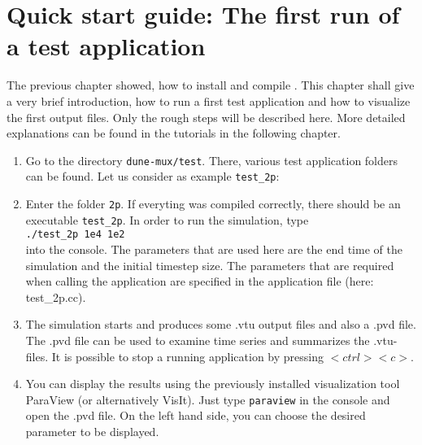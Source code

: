 \section[Quick start guide]{Quick start guide: The first run of a test application}\label{quick-start-guide}

The previous chapter showed, how to install and compile \Dumux. This chapter shall give a very brief introduction, how to run a first test application and how to visualize the first output files. Only the rough steps will be described here. More detailed explanations can be found in the tutorials in the following chapter.

\begin{enumerate}
 \item Go to the directory \texttt{dune-mux/test}. There, various test application folders can be found. Let us consider as example \texttt{test{\_}2p}:
 \item Enter the folder \texttt{2p}. If everyting was compiled correctly, there should be an executable \texttt{test{\_}2p}. In order to run the simulation, type\\ 
\texttt{./test{\_}2p 1e4 1e2}\\
into the console. The parameters that are used here are the end time of the simulation and the initial timestep size. The parameters that are required when calling the application are specified in the application file (here: test{\_}2p.cc).
 \item The simulation starts and produces some .vtu output files and also a .pvd file. The .pvd file can be used to examine time series and summarizes the .vtu-files. It is possible to stop a running application by pressing $<ctrl><c>$.
 \item You can display the results using the previously installed visualization tool ParaView (or alternatively VisIt). Just type \texttt{paraview} in the console and open the .pvd file. On the left hand side, you can choose the desired parameter to be displayed.
\end{enumerate}
% 
%
%


